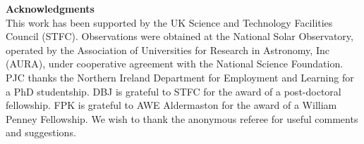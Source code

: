 \documentclass{emulateapj}
\begin{document}


{\bf Acknowledgments}\\
This work has been supported by the UK Science and Technology Facilities Council (STFC). Observations were obtained at the National Solar Observatory, operated by the Association of Universities for Research in Astronomy, Inc (AURA), under cooperative agreement with the National Science Foundation.  PJC thanks the Northern Ireland Department for Employment and Learning for a PhD studentship.  DBJ is grateful to STFC for the award of a post-doctoral fellowship. FPK is grateful to AWE Aldermaston for the award of a William Penney Fellowship. We wish to thank the anonymous referee for useful comments and suggestions. 
\end{document}
